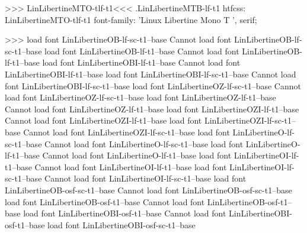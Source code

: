 {{{{{{{>>>
\<LinLibertineMTO-tlf-t1\><<<
.LinLibertineMTB-lf-t1
htfcss:  LinLibertineMTO-tlf-t1  font-family: 'Linux Libertine Mono T ', serif;

>>>
load font	LinLibertineOB-lf-sc-t1--base
Cannot load font LinLibertineOB-lf-sc-t1--base
load font	LinLibertineOB-lf-t1--base
Cannot load font LinLibertineOB-lf-t1--base
load font	LinLibertineOBI-lf-t1--base
Cannot load font LinLibertineOBI-lf-t1--base
load font	LinLibertineOBI-lf-sc-t1--base
Cannot load font LinLibertineOBI-lf-sc-t1--base
load font	LinLibertineOZ-lf-sc-t1--base
Cannot load font LinLibertineOZ-lf-sc-t1--base
load font	LinLibertineOZ-lf-t1--base
Cannot load font LinLibertineOZ-lf-t1--base
load font	LinLibertineOZI-lf-t1--base
Cannot load font LinLibertineOZI-lf-t1--base
load font	LinLibertineOZI-lf-sc-t1--base
Cannot load font LinLibertineOZI-lf-sc-t1--base
load font	LinLibertineO-lf-sc-t1--base
Cannot load font LinLibertineO-lf-sc-t1--base
load font	LinLibertineO-lf-t1--base
Cannot load font LinLibertineO-lf-t1--base
load font	LinLibertineOI-lf-t1--base
Cannot load font LinLibertineOI-lf-t1--base
load font	LinLibertineOI-lf-sc-t1--base
Cannot load font LinLibertineOI-lf-sc-t1--base
load font	LinLibertineOB-osf-sc-t1--base
Cannot load font LinLibertineOB-osf-sc-t1--base
load font	LinLibertineOB-osf-t1--base
Cannot load font LinLibertineOB-osf-t1--base
load font	LinLibertineOBI-osf-t1--base
Cannot load font LinLibertineOBI-osf-t1--base
load font	LinLibertineOBI-osf-sc-t1--base
}}}}}}}
